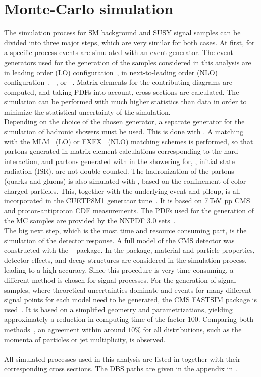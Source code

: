 \section{Monte-Carlo simulation}\label{sec:Simulation}
The simulation process for SM background and SUSY signal samples can be divided into three major steps, which are very similar for both cases. At first, for a specific process events are simulated with an event generator. The event generators used for the generation of the samples considered in this analysis are  in leading order (LO) configuration~\cite{Madgraph1,Madgraph2,Madgraph3}, \MGvATNLO in next-to-leading order (NLO) configuration~\cite{Madgraph1,AMCATNLO}, ~\cite{Pythia}, or \POWHEG~\cite{Powheg1,Powheg2}. Matrix elements for the contributing diagrams are computed, and taking PDFs into account, cross sections are calculated. The simulation can be performed with much higher statistics than data in order to minimize the statistical uncertainty of the simulation.\\
Depending on the choice of the chosen generator, a separate generator for the simulation of hadronic showers must be used. This is done with . A matching with the \textsc{MLM}~\cite{Madgraph2} (LO) or \textsc{FXFX}~\cite{AMCATNLO} (NLO) matching schemes is performed, so that partons generated in matrix element calculations corresponding to the hard interaction, and partons generated with \PYTHIA in the showering for, \eg, initial state radiation (ISR), are not double counted. The hadronization of the partons (quarks and gluons) is also simulated with \PYTHIA, based on the confinement of color charged particles. This, together with the underlying event and pileup, is all incorporated in the \textsc{CUETP8M1} generator tune~\cite{Tune}. It is based on $7\,\text{Te\hspace{-.08em}V}$ pp CMS and proton-antiproton CDF measurements. The PDFs used for the generation of the MC samples are provided by the \textsc{NNPDF} 3.0 sets~\cite{NNPDF}.\\
The big next step, which is the most time and resource consuming part, is the simulation of the detector response. A full model of the CMS detector was constructed with the \GEANTfour~\cite{Geant} package. In the \GEANTfour package, material and particle properties, detector effects, and decay structures are considered in the simulation process, leading to a high accuracy. Since this procedure is very time consuming, a different method is chosen for signal processes. For the generation of signal samples, where theoretical uncertainties dominate and events for many different signal points for each model need to be generated, the CMS \textsc{FASTSIM} package is used~\cite{FastSim}. It is based on a simplified geometry and parametrizations, yielding approximately a reduction in computing time of the factor $100$. Comparing both methods~\cite{FastSimQuality}, an agreement within around $10\%$ for all distributions, such as the momenta of particles or jet multiplicity, is observed.\\
\\
All simulated processes used in this analysis are listed in  together with their corresponding cross sections. The DBS paths are given in the appendix in .\\



